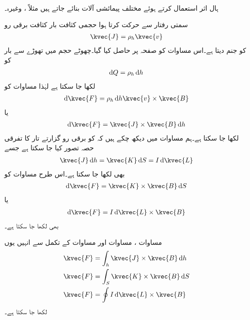 ہال اثر استعمال کرتے ہوئے مختلف پیمائشی آلات بنائے جاتے ہیں مثلاً ،  وغیرہ۔

سمتی رفتار  سے حرکت کرتا ہوا حجمی کثافت بار   کثافت برقی رو 
\begin{align}
\kvec{J}=\rho_h \kvec{v}
\end{align}
کو جنم دیتا ہے۔اس مساوات کو صفحہ  پر حاصل کیا گیا۔چھوٹے حجم  میں تھوڑے سے بار کو
\begin{align}
\dif Q=\rho_h \dif h
\end{align}
لکھا جا سکتا ہے لہٰذا مساوات  کو
\begin{align*}
\dif \kvec{F}=\rho_h \dif h \kvec{v} \times \kvec{B}
\end{align*}
یا
\begin{align}\label{مساوات_امالہ_لورنز_تفرقی_الف}
\dif \kvec{F}=\kvec{J} \times \kvec{B} \dif h
\end{align}
لکھا جا سکتا ہے۔ہم مساوات  میں دیکھ چکے ہیں کہ  کو برقی رو گزارتے تار کا تفرقی حصہ تصور کیا جا سکتا ہے جسے 
\begin{align*}
\kvec{J} \dif h=\kvec{K} \dif S=I \dif \kvec{L}
\end{align*}
بھی لکھا جا سکتا ہے۔اس طرح مساوات  کو
\begin{align}\label{مساوات_امالہ_لورنز_تفرقی_ب}
\dif \kvec{F}=\kvec{K} \times \kvec{B} \dif S
\end{align}
یا 
\begin{align}\label{مساوات_امالہ_لورنز_تفرقی_پ}
\dif \kvec{F}=I \dif \kvec{L} \times \kvec{B}
\end{align}
بھی لکھا جا سکتا ہے۔

مساوات ، مساوات  اور مساوات  کے تکمل سے انہیں یوں
\begin{align}
\kvec{F}&=\int_h \kvec{J} \times \kvec{B} \dif h \label{مساوات_امالہ_لورنز_تکمل_ت}\\
\kvec{F}&=\int_S \kvec{K} \times \kvec{B} \dif S \label{مساوات_امالہ_لورنز_تکمل_ٹ}\\
\kvec{F}&=\oint I \dif \kvec{L} \times \kvec{B} \label{مساوات_امالہ_لورنز_تکمل_پ}
\end{align}
لکھا جا سکتا ہے۔

